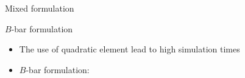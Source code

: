 \documentclass[9pt]{beamer}
\begin{document}
\begin{frame}{Mixed formulation}

\end{frame}


\begin{frame}{$B$-bar formulation}
    
	\begin{itemize}
		\item The use of quadratic element lead to high simulation times
		\item $B$-bar formulation: 
	\end{itemize}	    
    
\end{frame}


\section*{}
\end{document}

